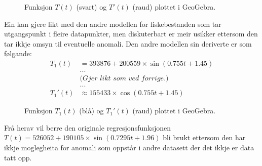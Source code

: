 \documentclass{report}
\begin{document}
\begin{figure}[H]
	\centering
	\caption{Funksjon $T(t)$ (svart) og $T'(t)$ (raud) plottet i GeoGebra.}
	\label{TOGTDER}
\end{figure}
Ein kan gjere likt med den andre modellen for fiskebestanden som tar utgangspunkt i fleire datapunkter, men diskuterbart er meir usikker ettersom den tar ikkje omsyn til eventuelle anomali.
Den andre modellen sin deriverte er som følgande:
\begin{align*}
	T_{1}(t)  & = 393876+200559\times \sin(0.755t+1.45) \\
	          & ...                                     \\
	          & \textit{(Gjer likt som ved forrige.)}   \\
	          & ...                                     \\
	T_{1}'(t) & \approx 155433 \times \cos(0.755t+1.45)
\end{align*}
\begin{figure}[H]
	\centering
	\caption{Funksjon $T_{1}(t)$ (blå) og $T_{1}'(t)$ (raud) plottet i GeoGebra.}
	\label{F5}
\end{figure}
Frå herav vil berre den originale regresjonsfunksjonen $T(t)=526052+190105\times \sin(0.7295t+1.96)$ bli brukt ettersom den har ikkje moglegheita for anomali som oppstår i andre datasett der det ikkje er data tatt opp.
\end{document}
